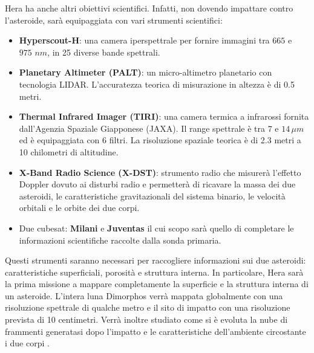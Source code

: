 \documentclass[a4paper,11pt,openright]{book}
\begin{document}
Hera ha anche altri obiettivi scientifici. Infatti, non dovendo impattare contro l'asteroide, sarà equipaggiata con vari strumenti scientifici:
\begin{itemize}
    \item \textbf{Hyperscout-H}: una camera iperspettrale per fornire immagini tra $665$ e $975\,\, nm$, in 25 diverse bande spettrali.
    \item \textbf{Planetary Altimeter (PALT)}: un micro-altimetro planetario con tecnologia LIDAR. L'accuratezza teorica di misurazione in altezza è di 0.5 metri.
    \item \textbf{Thermal Infrared Imager (TIRI)}: una camera termica a infrarossi fornita dall'Agenzia Spaziale Giapponese (JAXA). Il range spettrale è tra $7$ e $14\,\mu m$ ed è equipaggiata con 6 filtri. La risoluzione spaziale teorica è di 2.3 metri a 10 chilometri di altitudine.
    \item \textbf{X-Band Radio Science (X-DST)}: strumento radio che misurerà l'effetto Doppler dovuto ai disturbi radio e permetterà di ricavare la massa dei due asteroidi, le caratteristiche gravitazionali del sistema binario, le velocità orbitali e le orbite dei due corpi.
    \item Due cubesat: \textbf{Milani} e \textbf{Juventas} il cui scopo sarà quello di completare le informazioni scientifiche raccolte dalla sonda primaria.
\end{itemize}
Questi strumenti saranno necessari per raccogliere informazioni sui due asteroidi: caratteristiche superficiali, porosità e struttura interna. In particolare, Hera sarà la prima missione a mappare completamente la superficie e la struttura interna di un asteroide. L'intera luna Dimorphos verrà mappata globalmente con una risoluzione spettrale di qualche metro e il sito di impatto con una risoluzione prevista di 10 centimetri. Verrà inoltre studiato come si è evoluta la nube di frammenti generatasi dopo l'impatto e le caratteristiche dell'ambiente circostante i due corpi \citep{michel_esa_2022}.
\end{document}
